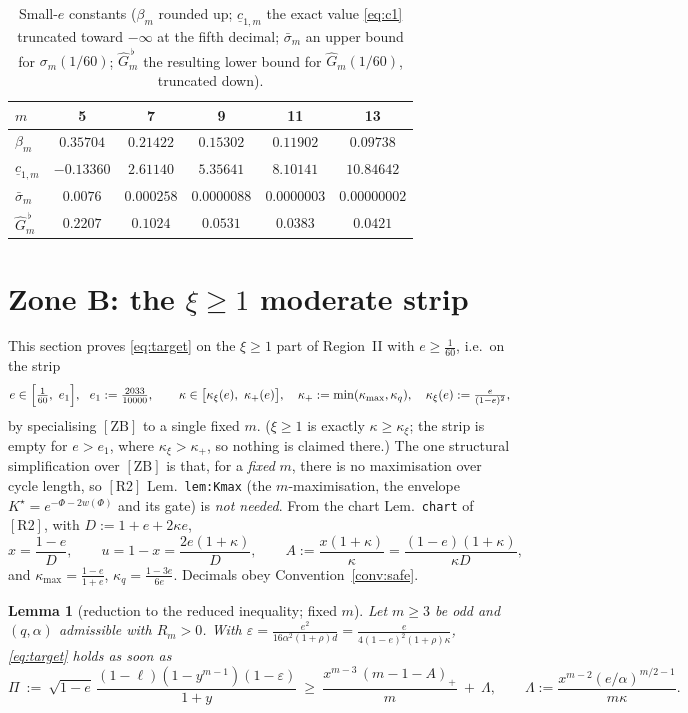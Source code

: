 \documentclass[11pt]{amsart}
\newtheorem{lemma}[theorem]{Lemma}
\newcommand{\eps}{\varepsilon}
\newcommand{\kxi}{\kappa_\xi}
\newcommand{\kq}{\kappa_q}
\newcommand{\kmx}{\kappa_{\max}}
\newcommand{\khi}{\kappa_{+}}
\newcommand{\RII}{[\textrm{R2}]}
\newcommand{\ZB}{[\textrm{ZB}]}
\begin{document}
\begin{table}[h]\centering
\begin{tabular}{lccccc}\toprule
$m$&5&7&9&11&13\\\midrule
$\beta_m$&$0.35704$&$0.21422$&$0.15302$&$0.11902$&$0.09738$\\
$\underline c_{1,m}$ &$-0.13360$&$2.61140$&$5.35641$&$8.10141$&$10.84642$\\
$\bar\sigma_m$&$0.0076$&$0.000258$&$0.0000088$&$0.0000003$&$0.00000002$\\
$\widehat G_m^{\,\flat}$&$0.2207$&$0.1024$&$0.0531$&$0.0383$&$0.0421$\\
\bottomrule
\end{tabular}
\caption{Small-$e$ constants ($\beta_m$ rounded up; $\underline c_{1,m}$ the
exact value \eqref{eq:c1} truncated toward $-\infty$ at the fifth decimal;
$\bar\sigma_m$ an upper bound for $\sigma_m(1/60)$;
$\widehat G_m^{\,\flat}$ the resulting lower bound for $\widehat G_m(1/60)$,
truncated down).}\label{tab:smalle}
\end{table}

\section{Zone B: the $\xi\ge1$ moderate strip}\label{sec:zoneB}

This section proves \eqref{eq:target} on the $\xi\ge1$ part of Region~II with
$e\ge\tfrac1{60}$, i.e.\ on the strip
\[
 e\in\Bigl[\tfrac1{60},\ e_1\Bigr],\ \ e_1:=\tfrac{2033}{10000},\qquad
 \kappa\in\bigl[\kxi(e),\ \khi(e)\bigr],\quad \khi:=\min(\kmx,\kq),\quad
 \kxi(e):=\tfrac{e}{(1-e)^2},
\]
by specialising $\ZB$ to a single fixed $m$.  ($\xi\ge1$ is exactly
$\kappa\ge\kxi$; the strip is empty for $e>e_1$, where $\kxi>\khi$, so nothing
is claimed there.)  The one structural simplification over $\ZB$ is that, for a
\emph{fixed} $m$, there is no maximisation over cycle length, so $\RII$
Lem.~\texttt{lem:Kmax} (the $m$-maximisation, the envelope
$K^\star=e^{-\Phi-2w(\Phi)}$ and its gate) is \emph{not needed}.  From the chart
Lem.~\texttt{chart} of $\RII$, with $D:=1+e+2\kappa e$,
\begin{equation}\label{zb9:chart}
 x=\frac{1-e}{D},\qquad u=1-x=\frac{2e(1+\kappa)}{D},\qquad
 A:=\frac{x(1+\kappa)}{\kappa}=\frac{(1-e)(1+\kappa)}{\kappa D},
\end{equation}
and $\kmx=\tfrac{1-e}{1+e}$, $\kq=\tfrac{1-3e}{6e}$.  Decimals obey
Convention~\ref{conv:safe}.

\begin{lemma}[reduction to the reduced inequality; fixed $m$]\label{zb9:red}
Let $m\ge3$ be odd and $(q,\alpha)$ admissible with $R_m>0$.  With
$\eps=\tfrac{e^2}{16\alpha^2(1+\rho)d}=\tfrac{e}{4(1-e)^2(1+\rho)\kappa}$,
\eqref{eq:target} holds as soon as
\begin{equation}\label{zb9:reduced}
 \Pi\ :=\ \sqrt{1-e}\,\frac{(1-\ell)(1-y^{m-1})(1-\eps)}{1+y}
 \ \ge\ \frac{x^{m-3}\,(m-1-A)_+}{m}\ +\ \Lambda,
 \qquad
 \Lambda:=\frac{x^{m-2}(e/\alpha)^{m/2-1}}{m\kappa}.
\end{equation}
\end{lemma}
\end{document}
